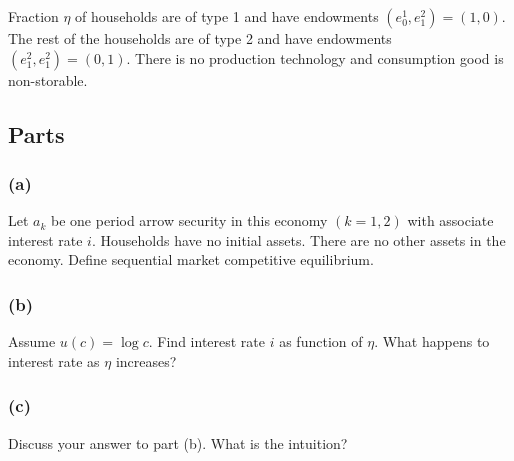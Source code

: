 \documentclass[10pt, a4paper]{article}
\begin{document}
Fraction $\eta$ of households are of type 1 and have endowments $(e^1_0, e^2_1) = (1,0)$. The rest of the households are of type 2 and have endowments $(e^2_1, e^2_1) = (0,1)$. There is no production technology and consumption good is non-storable.

\subsection*{Parts}
\subsubsection*{(a)}
Let $a_k$ be one period arrow security in this economy $(k = 1,2)$ with associate interest rate $i$. Households have no initial assets. There are no other assets in the economy. Define sequential market competitive equilibrium.

\subsubsection*{(b)}
Assume $u(c) = \log c$. Find interest rate $i$ as function of $\eta$. What happens to interest rate as $\eta$ increases?

\subsubsection*{(c)}
Discuss your answer to part (b). What is the intuition?
\end{document}
